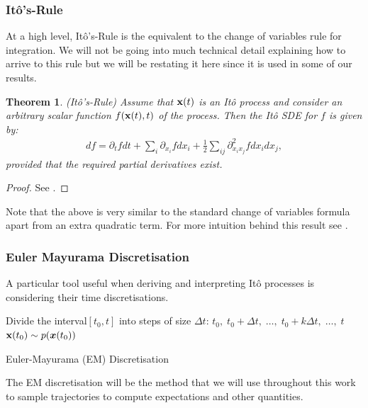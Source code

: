 \documentclass[a4paper,12pt,twoside,openright]{report}
\newtheorem{theorem}{Theorem}
\theoremstyle{definition}
\begin{document}
\subsubsection{Itô's-Rule}

At a high level, Itô's-Rule is the equivalent to the change of variables rule for integration. We will not be going into much technical detail explaining how to arrive to this rule but we will be restating it here since it is used in some of our results. 

\begin{theorem}
  (Itô's-Rule) Assume that ${\mathbf{x}}(t)$ is an Itô process and consider an arbitrary scalar function $f({\mathbf{x}}(t), t)$ of the process. Then the Itô SDE for $f$ is given by:
  \begin{align}\label{eq:ito_rule}
      df = \partial_t f dt + \sum_i \partial_{{x_i}} f dx_i + \frac{1}{2}\sum_{ij} \partial^2_{{x_i}{x_j}} f dx_i dx_j,
  \end{align}
  provided that the required partial derivatives exist. 
\end{theorem}
\begin{proof}
See \cite{oksendal2003stochastic}.
\end{proof}
Note that the above is very similar to the standard change of variables formula apart from an extra quadratic term. For more intuition behind this result see \citet[Chapter~4]{sarkka2019applied}.

\subsubsection{Euler Mayurama Discretisation}

A particular tool useful when deriving and interpreting Itô processes is considering their time discretisations.
\begin{algorithm} \label{alg:em}
Divide the interval$[t_0, t]$ into steps of size $\Delta t$: $t_0, \;t_0 + \Delta t,\; \hdots ,\; t_0 + k \Delta t,\; \hdots, \;t$ \\
${\mathbf{x}}(t_0) \sim p({\bm{x}}(t_0))$\\
\caption{Euler-Mayurama (EM) Discretisation }
\end{algorithm}
The EM discretisation will be the method that we will use throughout this work to sample trajectories to compute expectations and other quantities.
\end{document}
